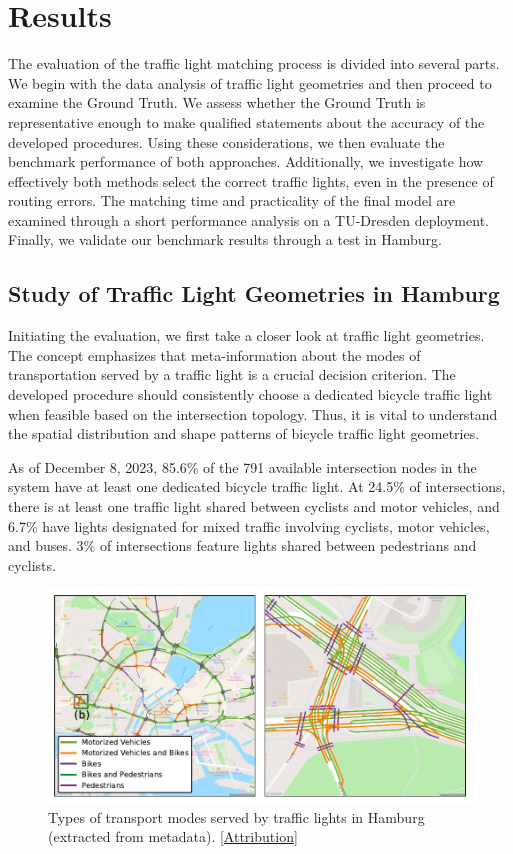 \section{Results}

The evaluation of the traffic light matching process is divided into several parts. We begin with the data analysis of traffic light geometries and then proceed to examine the Ground Truth. We assess whether the Ground Truth is representative enough to make qualified statements about the accuracy of the developed procedures. Using these considerations, we then evaluate the benchmark performance of both approaches. Additionally, we investigate how effectively both methods select the correct traffic lights, even in the presence of routing errors. The matching time and practicality of the final model are examined through a short performance analysis on a TU-Dresden deployment. Finally, we validate our benchmark results through a test in Hamburg.

\subsection{Study of Traffic Light Geometries in Hamburg}

Initiating the evaluation, we first take a closer look at traffic light geometries. The concept emphasizes that meta-information about the modes of transportation served by a traffic light is a crucial decision criterion. The developed procedure should consistently choose a dedicated bicycle traffic light when feasible based on the intersection topology. Thus, it is vital to understand the spatial distribution and shape patterns of bicycle traffic light geometries.

As of December 8, 2023, 85.6\% of the 791 available intersection nodes in the system have at least one dedicated bicycle traffic light. At 24.5\% of intersections, there is at least one traffic light shared between cyclists and motor vehicles, and 6.7\% have lights designated for mixed traffic involving cyclists, motor vehicles, and buses. 3\% of intersections feature lights shared between pedestrians and cyclists.

\begin{figure}[t]
\centering
\includegraphics[width=\linewidth]{images/lanes-map.pdf}
\caption{Types of transport modes served by traffic lights in Hamburg (extracted from metadata). [\hyperref[attribution]{Attribution}]}
\label{fig:lanes-map}
\end{figure}

